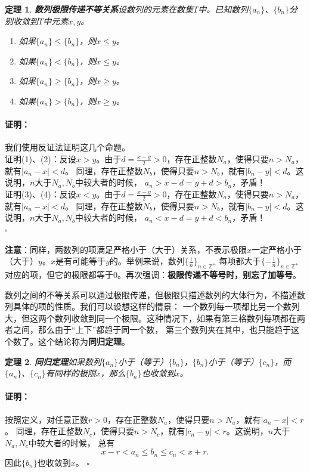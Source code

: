 \documentclass[12pt,UTF8]{ctexbook}
\newtheorem{tm}{定理}[section]
\renewenvironment{proof}{\paragraph{\textbf{证明：}}}{\hfill$\square$}
\begin{document}
\begin{appendix}
\begin{tm}{\textbf{数列极限传递不等关系}}\label{tm:a-0-45}
    设数列的元素在数集$T$中。已知数列$\{a_n\}$、$\{b_n\}$分别收敛到$T$中元素$x,y$。
    \begin{enumerate}
        \item 如果$\{a_n\} \leqslant \{b_n\}$，则$x\leqslant y$。
        \item 如果$\{a_n\} < \{b_n\}$，则$x\leqslant y$。
        \item 如果$\{a_n\} \geqslant \{b_n\}$，则$x\geqslant y$。
        \item 如果$\{a_n\} > \{b_n\}$，则$x\geqslant y$。
    \end{enumerate}
\end{tm}
\begin{proof}
    我们使用反证法证明这几个命题。\\
    证明(1)、(2)：反设$x > y$。由于$d = \frac{x - y}{2} > 0$，存在正整数$N_a$，使得只要$n>N_a$，就有$|a_n - x| < d$。
    同理，存在正整数$N_b$，使得只要$n>N_b$，就有$|b_n - y| < d$。这说明，$n$大于$N_a,N_b$中较大者的时候，
    $a_n > x - d = y + d > b_n$，矛盾！\\
    证明(3)、(4)：反设$x < y$。由于$d = \frac{x - y}{2} > 0$，存在正整数$N_a$，使得只要$n>N_a$，就有$|a_n - x| < d$。
    同理，存在正整数$N_b$，使得只要$n>N_b$，就有$|b_n - y| < d$。这说明，$n$大于$N_a,N_b$中较大者的时候，
    $a_n < x - d = y + d < b_n$，矛盾！\\
\end{proof}

\textbf{注意}：同样，两数列的项满足严格小于（大于）关系，不表示极限$x$一定严格小于（大于）$y$。$x$是有可能等于$y$的。举例来说，数列$\{\frac{1}{n}\}_{n\in\mathbb{Z}^+}$
每项都大于$\{-\frac{1}{n}\}_{n\in\mathbb{Z}^+}$对应的项，但它的极限都等于$0$。再次强调：\textbf{极限传递不等号时，别忘了加等号}。

数列之间的不等关系可以通过极限传递，但极限只描述数列的大体行为，不描述数列具体的项的性质。我们可以设想这样的情景：
一个数列每一项都比另一个数列大，但这两个数列收敛到同一个极限。这种情况下，如果有第三格数列每项都在两者之间，那么由于“上下”都趋于同一个数，
第三个数列夹在其中，也只能趋于这个数了。这个结论称为\textbf{同归定理}。
\begin{tm}{\textbf{同归定理}}\label{tm:a-0-48}
    如果数列$\{a_n\}$小于（等于）$\{b_n\}$，$\{b_n\}$小于（等于）$\{c_n\}$，而$\{a_n\}$、$\{c_n\}$有同样的极限$x$，那么$\{b_n\}$也收敛到$x$。
\end{tm}
\begin{proof}
    按照定义，对任意正数$r>0$，存在正整数$N_a$，使得只要$n>N_a$，就有$|a_n - x| < r$。
    同理，存在正整数$N_c$，使得只要$n>N_c$，就有$|c_n - y| < r$。这说明，$n$大于$N_a,N_c$中较大者的时候，
    总有
    $$ x - r < a_n \leqslant b_n \leqslant c_n < x + r. $$
    因此$\{b_n\}$也收敛到$x$。
\end{proof}


\end{appendix}
\end{document}
